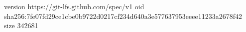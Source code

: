 version https://git-lfs.github.com/spec/v1
oid sha256:7fe07fd29ce1cbe0b9722d0217cf234d640a3e577637953eeee11233a2678f42
size 342681
